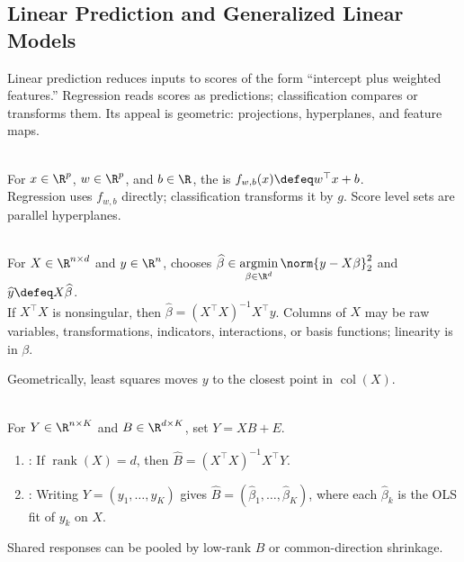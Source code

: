 \subsection{Linear Prediction and Generalized Linear Models}

Linear prediction reduces inputs to scores of the form ``intercept plus weighted features.'' Regression reads scores as predictions; classification compares or transforms them.  Its appeal is geometric: projections, hyperplanes, and feature maps.

\begin{definition} \label{def:sl-linear-predictor} \\
For $x\in\R^p$, $w\in\R^p$, and $b\in\R$, the  is $f_{w,b}(x)\defeq w^\top x+b$.\\
Regression uses $f_{w,b}$ directly; classification transforms it by $g$. Score level sets are parallel hyperplanes.
\end{definition}

\begin{definition} \label{def:sl-least-squares-linear-regression} \\
For $X\in\R^{n\times d}$ and $y\in\R^n$,  chooses $\widehat{\beta}\in\operatorname*{argmin}\limits_{\beta\in\R^d}\norm{y-X\beta}_2^2$ and $\widehat{y}\defeq X\widehat{\beta}$.\\
If $X^\top X$ is nonsingular, then $\widehat{\beta}=(X^\top X)^{-1}X^\top y$. Columns of $X$ may be raw variables, transformations, indicators, interactions, or basis functions; linearity is in $\beta$.
\end{definition}

Geometrically, least squares moves $y$ to the closest point in $\operatorname{col}(X)$.

\begin{method} \label{meth:sl-multiple-output-least-squares} \\
For $Y\in\R^{n\times K}$ and $B\in\R^{d\times K}$, set $Y=XB+E$.
\begin{enumerate}[label=(\roman*)]
\setlength{\itemsep}{0pt}
\item {}: If $\operatorname{rank}(X)=d$, then $\widehat{B}=(X^\top X)^{-1}X^\top Y$.
\item {}: Writing $Y=(y_1,\ldots,y_K)$ gives $\widehat{B}=(\widehat{\beta}_1,\ldots,\widehat{\beta}_K)$, where each $\widehat{\beta}_k$ is the OLS fit of $y_k$ on $X$.
\end{enumerate}
Shared responses can be pooled by low-rank $B$ or common-direction shrinkage.
\end{method}

